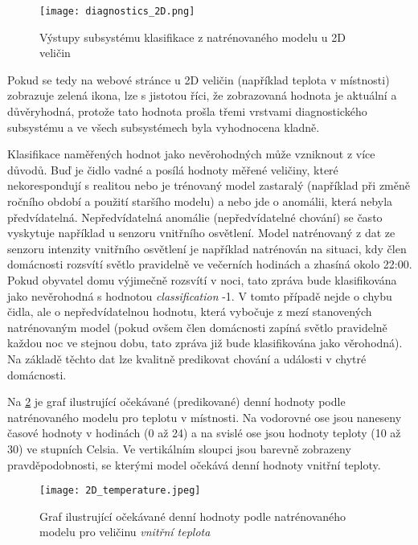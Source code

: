 \begin{figure}[H]
  \centering
  \texttt{[image: diagnostics\_2D.png]}
  \caption{Výstupy subsystému klasifikace z natrénovaného modelu u 2D veličin}
  \label{fig:diagnostics_2D}
\end{figure}  

Pokud se tedy na webové stránce u 2D veličin (například teplota v místnosti) zobrazuje zelená ikona, lze s jistotou říci, že zobrazovaná hodnota je aktuální a důvěryhodná, protože tato hodnota prošla třemi vrstvami diagnostického subsystému a ve všech subsystémech byla vyhodnocena kladně. \par
Klasifikace naměřených hodnot jako nevěrohodných může vzniknout z více důvodů. Buď je čidlo vadné a posílá hodnoty měřené veličiny, které nekorespondují s realitou nebo je trénovaný model zastaralý (například při změně ročního období a použití staršího modelu) a nebo jde o anomálii, která nebyla předvídatelná. Nepředvídatelná anomálie (nepředvídatelné chování) se často vyskytuje například u senzoru vnitřního osvětlení. Model natrénovaný z dat ze senzoru intenzity vnitřního osvětlení je například natrénován na situaci, kdy člen domácnosti rozsvítí světlo pravidelně ve večerních hodinách a zhasíná okolo 22:00. Pokud obyvatel domu výjimečně rozsvítí v noci, tato zpráva bude klasifikována jako nevěrohodná s hodnotou \textit{classification} -1. V tomto případě nejde o chybu čidla, ale o nepředvídatelnou hodnotu, která vybočuje z mezí stanovených natrénovaným model (pokud ovšem člen domácnosti zapíná světlo pravidelně každou noc ve stejnou dobu, tato zpráva již bude klasifikována jako věrohodná). Na základě těchto dat lze kvalitně predikovat chování a události v chytré domácnosti. \par
Na \cref{fig:2D_temperature} je graf ilustrující očekávané (predikované) denní hodnoty podle natrénovaného modelu pro teplotu v místnosti. Na vodorovné ose jsou naneseny časové hodnoty v hodinách (0 až 24) a na svislé ose jsou hodnoty teploty (10 až 30) ve stupních Celsia. Ve vertikálním sloupci jsou barevně zobrazeny pravděpodobnosti, se kterými model očekává denní hodnoty vnitřní teploty. 

\begin{figure}[H]
  \centering
  \texttt{[image: 2D\_temperature.jpeg]}
  \caption{Graf ilustrující očekávané denní hodnoty podle natrénovaného modelu pro veličinu \textit{vnitřní teplota}}
  \label{fig:2D_temperature}
\end{figure}  

